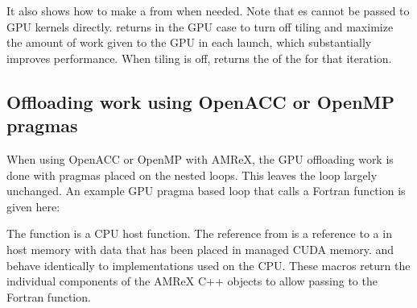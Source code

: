 \documentclass[letterpaper,10pt,english]{sphinxmanual}
\begin{document}
\sphinxAtStartPar
It also shows how to make a  from  when
needed.  Note that es cannot be passed to GPU
kernels directly.   returns  in the
GPU case to turn off tiling and maximize the amount of work given to
the GPU in each launch, which substantially improves performance.
When tiling is off,  returns the  of
the  for that iteration.


\subsection{Offloading work using OpenACC or OpenMP pragmas}
\label{\detokenize{GPU:offloading-work-using-openacc-or-openmp-pragmas}}
\sphinxAtStartPar
When using OpenACC or OpenMP with AMReX, the GPU offloading work is done
with pragmas placed on the nested loops. This leaves the  loop
largely unchanged.  An example GPU pragma based  loop that calls
a Fortran function is given here:

\begin{sphinxVerbatim}[commandchars=\\\{\}]
    
        
       \PYG{p}{[}\PYG{p}{]}
\end{sphinxVerbatim}

\sphinxAtStartPar
The function  is a CPU host function.  The
 reference
from  is a reference to a  in host
memory with data that has been placed in managed CUDA memory.
 and  behave identically
to implementations used on the CPU.  These macros return the
individual components of the AMReX C++ objects to allow passing to
the Fortran function.
\end{document}
